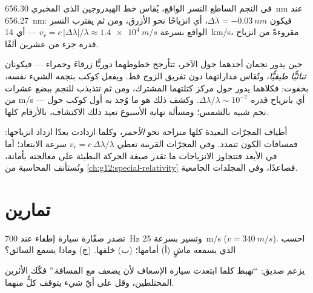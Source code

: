\begin{example}\label{ex:g12:doppler-effect:vega}
في  النجم الساطع النسر الواقع، يُقاس خط الهيدروجين الذي  المخبري
\qty{656.30}{nm} عند \qty{656.27}{nm}: فيكون $\Delta\lambda = \qty{-0.03}{nm}$، أي
انزياحًا نحو الأزرق، ومن ثم يقترب النسر الواقع بسرعة $v_r = c\,|\Delta\lambda|/\lambda \approx \qty{1.4e4}{m/s}$
--- أي \qty{14}{km/s}، مقروءةً من انزياح قدره جزء من عشرين ألفًا.
\end{example}

\begin{example}\label{ex:g12:doppler-effect:wobble}
حين يدور نجمان أحدهما حول الآخر، تتأرجح خطوطهما دوريًّا زرقاءَ وحمراء --- فيكونان
\emph{ثنائيًّا طيفيًّا}، وتُقاس مداراتهما دون تفريق الزوج قط. ويفعل كوكب
بنجمه الشيء نفسه، بخفوت: فكلاهما يدور حول مركز كتلتهما المشترك، ومن ثم تتذبذب
 للنجم ببضع عشرات من \unit{m/s} --- أي بانزياح قدره $\Delta\lambda/\lambda \sim 10^{-7}$.
وكشف ذلك هو ما وُجد به أول كوكب حول نجم شبيه بالشمس؛ ومسألة نهاية الأسبوع
تعيد ذلك الاكتشاف، بالأرقام كلها.
\end{example}

\begin{remark}\label{rem:g12:doppler-effect:expansion}
أطياف المجرّات البعيدة كلها منزاحة نحو \emph{الأحمر}، وكلما ازدادت بعدًا ازداد
انزياحها: فمسافات الكون تتمدد. وفي المجرّات القريبة تعطي
$v_r = c\,\Delta\lambda/\lambda$ سرعة الابتعاد؛ أما في الأبعد فتتجاوز الانزياحات
ما تقدر صيغة الحركة البطيئة على معالجته بأمانة، وتُستأنف المحاسبة
من \cref{ch:g12:special-relativity} فصاعدًا، وفي المجلدات الجامعية.
\end{remark}

\section{تمارين}

\begin{exercise}[$\star$]\label{exo:g12:doppler-effect:1}
تصدر صفّارة سيارة إطفاء عند \qty{700}{Hz} وتسير بسرعة \qty{25}{m/s} ($v = \qty{340}{m/s}$).
احسب  الذي يسمعه ماشٍ (أ) أمامها؛ (ب) خلفها. (ج) وماذا يسمع
السائق؟
\end{exercise}

\begin{exercise}[$\star$]\label{exo:g12:doppler-effect:2}
يزعم صديق: ``تهبط  كلما ابتعدت سيارة الإسعاف لأن  يضعف
مع المسافة.'' فكّك الأثرين المختلطين، وقل على أيّ شيء يتوقف كلٌّ منهما.
\end{exercise}

